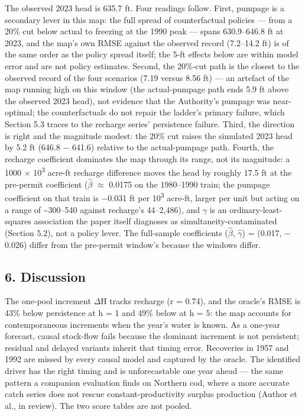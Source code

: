 \documentclass[11pt]{article}
\begin{document}
The observed 2023 head is 635.7 ft. Four readings follow. First, pumpage
is a secondary lever in this map: the full spread of counterfactual
policies --- from a 20\% cut below actual to freezing at the 1990 peak
--- spans 630.9--646.8 ft at 2023, and the map's own RMSE against the
observed record (7.2--14.2 ft) is of the same order as the policy spread
itself; the 5-ft effects below are within model error and are not policy
estimates. Second, the 20\%-cut path is the closest to the observed
record of the four scenarios (7.19 versus 8.56 ft) --- an artefact of
the map running high on this window (the actual-pumpage path ends 5.9 ft
above the observed 2023 head), not evidence that the Authority's pumpage
was near-optimal; the counterfactuals do not repair the ladder's primary
failure, which Section 5.3 traces to the recharge series' persistence
failure. Third, the direction is right and the magnitude modest: the
20\% cut raises the simulated 2023 head by 5.2 ft (646.8 \ensuremath{-} 641.6)
relative to the actual-pumpage path. Fourth, the recharge coefficient
dominates the map through its range, not its magnitude: a 1000 \ensuremath{\times} 10\textsuperscript{3}
acre-ft recharge difference moves the head by roughly 17.5 ft at the
pre-permit coefficient (\(\hat{\beta}\) \ensuremath{\approx} 0.0175 on the 1980--1990 train; the pumpage
coefficient on that train is \ensuremath{-}0.031 ft per 10\textsuperscript{3} acre-ft, larger per unit
but acting on a range of \textasciitilde300--540 against recharge's
44--2,486), and \ensuremath{\gamma} is an ordinary-least-squares association the paper
itself diagnoses as simultaneity-contaminated (Section 5.2), not a
policy lever. The full-sample coefficients (\(\hat{\beta}\), \(\hat{\gamma}\)) = (0.017, \ensuremath{-}0.026)
differ from the pre-permit window's because the windows differ.

\subsection{6. Discussion}\label{edw-discussion}

The one-pool increment \ensuremath{\Delta}H tracks recharge (r = 0.74), and the oracle's
RMSE is 43\% below persistence at h = 1 and 49\% below at h = 5: the map
accounts for contemporaneous increments when the year's water is known.
As a one-year forecast, causal stock-flow fails because the dominant
increment is not persistent; residual and delayed variants inherit that
timing error. Recoveries in 1957 and 1992 are missed by every causal
model and captured by the oracle. The identified driver has the right
timing and is unforecastable one year ahead --- the same pattern a
companion evaluation finds on Northern cod, where a more accurate catch
series does not rescue constant-productivity surplus production (Author
et al., in review). The two score tables are not pooled.
\end{document}
